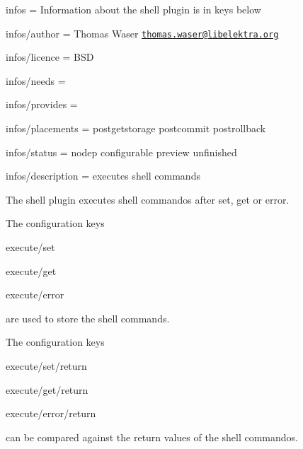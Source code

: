 
\begin{DoxyItemize}
\item infos = Information about the shell plugin is in keys below
\item infos/author = Thomas Waser \href{mailto:thomas.waser@libelektra.org}{\tt thomas.\+waser@libelektra.\+org}
\item infos/licence = B\+SD
\item infos/needs =
\item infos/provides =
\item infos/placements = postgetstorage postcommit postrollback
\item infos/status = nodep configurable preview unfinished
\item infos/description = executes shell commands
\end{DoxyItemize}

The shell plugin executes shell commandos after set, get or error.

The configuration keys


\begin{DoxyItemize}
\item {\ttfamily execute/set}
\item {\ttfamily execute/get}
\item {\ttfamily execute/error}
\end{DoxyItemize}

are used to store the shell commands.

The configuration keys


\begin{DoxyItemize}
\item {\ttfamily execute/set/return}
\item {\ttfamily execute/get/return}
\item {\ttfamily execute/error/return}
\end{DoxyItemize}

can be compared against the return values of the shell commandos.


 